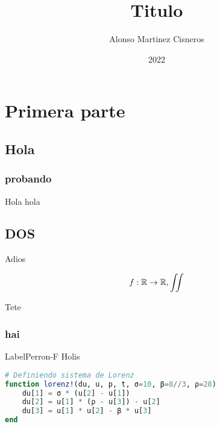 \documentclass[colorful]{sty/itam-thesis}
\author{Alonso Martinez Cisneros}
\title{Titulo}
\date{2022}
\begin{document}
\frontmatter
\maketitle
\makefrontmatter
{}

\mainmatter

\part{Primera parte}
\chapter{Hola}

\lipsum[1-10]

\section{probando}
Hola hola

\chapter{DOS}

Adios

\begin{equation}
	f: \mathbb{R} \to \mathbb{R}, \iint
\end{equation}

Tete

\section{hai}

\begin{mytheo}{Label}{Perron-F}
	Holis
\end{mytheo}

\begin{lstlisting}[language=julia, caption=Aplicando algoritmo de cifrado]
# Definiendo sistema de Lorenz
function lorenz!(du, u, p, t, σ=10, β=8//3, ρ=28)
    du[1] = σ * (u[2] - u[1])
    du[2] = u[1] * (ρ - u[3]) - u[2]
    du[3] = u[1] * u[2] - β * u[3]
end
\end{lstlisting}

\nocite{*}
\printbibliography
\end{document}
